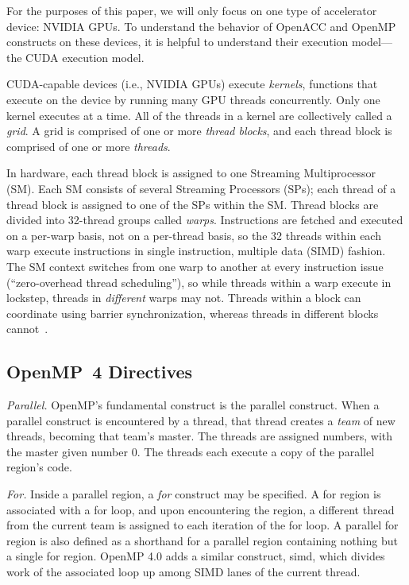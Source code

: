 \documentclass{sig-alternate-05-2015}
\begin{document}
For the purposes of this paper, we will only focus on one type of accelerator
device: NVIDIA GPUs.  To understand the behavior of OpenACC and OpenMP
constructs on these devices, it is helpful to understand their execution
model---the CUDA execution model.

CUDA-capable devices (i.e., NVIDIA GPUs) execute \emph{kernels}, functions that
execute on the device by running many GPU threads concurrently. Only one kernel
executes at a time. All of the threads in a kernel are collectively called a
\emph{grid}. A grid is comprised of one or more \emph{thread blocks}, and each
thread block is comprised of one or more \emph{threads}.

In hardware, each thread block is assigned to one Streaming Multiprocessor
(SM). Each SM consists of several Streaming Processors (SPs); each thread of a
thread block is assigned to one of the SPs within the SM.  Thread blocks are
divided into 32-thread groups called \emph{warps}.  Instructions are fetched
and executed on a per-warp basis, not on a per-thread basis, so the 32 threads
within each warp execute instructions in single instruction, multiple data
(SIMD) fashion.  The SM context switches from one warp to another at every
instruction issue (``zero-overhead thread scheduling''), so while threads
within a warp execute in lockstep, threads in \emph{different} warps may not.
Threads within a block can coordinate using barrier synchronization, whereas
threads in different blocks cannot~\cite{kirk2012programming}.

\subsection{OpenMP~4 Directives}

\emph{Parallel.}
OpenMP's fundamental construct is the parallel construct. When a parallel
construct is encountered by a thread, that thread creates a \emph{team} of new
threads, becoming that team's master. The threads are assigned numbers, with
the master given number 0. The threads each execute a copy of the parallel
region's code. %

\emph{For.}
Inside a parallel region, a \emph{for} construct may be specified. A for region
is associated with a for loop, and upon encountering the region, a different
thread from the current team is assigned to each iteration of the for loop. A
parallel for region is also defined as a shorthand for a parallel region
containing nothing but a single for region. OpenMP 4.0 adds a similar
construct, simd, which divides work of the associated loop up among SIMD lanes
of the current thread. 
\end{document}
